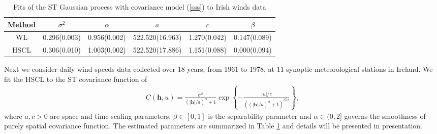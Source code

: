 \documentclass[twoside]{article}
\renewcommand{\/}[1]{\mathbf{\boldsymbol{#1}}}
\begin{document}
\begin{table}
	\centering
	\caption{ Fits of the ST Gaussian process with   covariance model  (\ref{sss})  to Irish winds data}\label{tab_e512}
	\begin{tabular}{cccccc}
	\hline\noalign{\smallskip}
Method&$\sigma^2$&$\alpha$&$a$&$c$&$\beta$\\
\hline
 WL&0.296(0.003)& 0.956(0.002)& 522.520(16.963) &  1.270(0.042)& 0.147(0.089)  \\
       HSCL&0.306(0.010)& 1.003(0.002)& 522.520(17.886) &  1.151(0.088)& 0.000(0.094)   \\
  \hline
	\end{tabular}
\end{table}
Next we consider daily wind speeds data collected over 18 years, from 1961 to 1978, at 11 synoptic meteorological stations in Ireland.  We  fit  the HSCL to
 the ST covariance function of  
\begin{eqnarray}\label{sss}
C(\/h,u)=\frac{\sigma^2}{({|\/h|}/{a})^\alpha+1}\exp\left\{-\frac{{|u|}/{c}}{(({|\/h|}/{a})^\alpha+1)^{\beta/2}}\right\},
\end{eqnarray}
where $a, c>0$ are space and time scaling parameters,  $\beta\in [0,1]$ is the separability parameter and $\alpha\in(0,2]$  governs the smoothness of purely spatial covariance function\citep{Gneiting2002}. The estimated parameters are summarized in Table \ref{tab_e512} and details will be presented in  presentation.
\end{document}
